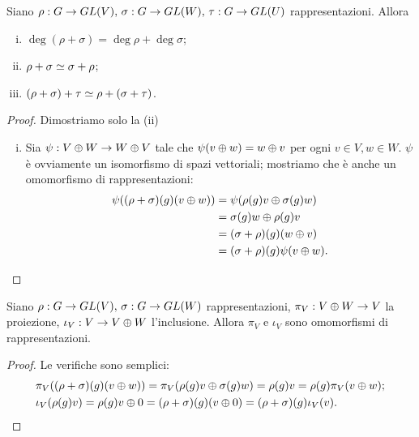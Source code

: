 \begin{proposition}
Siano $\rho:G\to GL(V),\,\allowbreak\sigma:G\to GL(W),\,\allowbreak\tau:G\to GL(U)$ rappresentazioni. Allora
\begin{enumerate}[(i)]
\item $\deg(\rho+\sigma)=\deg\rho+\deg\sigma$;
\item $\rho+\sigma\simeq\sigma+\rho$;
\item $(\rho+\sigma)+\tau\simeq\rho+(\sigma+\tau)$.
\end{enumerate}
\end{proposition}
\begin{proof}
Dimostriamo solo la (ii)
\begin{enumerate}[(i)]
\addtocounter{enumi}{1}
\item Sia $\psi:V\oplus W\to W\oplus V$ tale che $\psi(v\oplus w)=w\oplus v$ per ogni $v\in V\comma w\in W$. $\psi$ è ovviamente un isomorfismo di spazi vettoriali; mostriamo che è anche un omomorfismo di rappresentazioni:
\begin{align*}
\psi((\rho+\sigma)(g)(v\oplus w))&=\psi(\rho(g)v\oplus\sigma(g)w)\\
&=\sigma(g)w\oplus\rho(g)v\\
&=(\sigma+\rho)(g)(w\oplus v)\\
&=(\sigma+\rho)(g)\psi(v\oplus w).
\end{align*}
\end{enumerate}
\end{proof}

\begin{proposition}
Siano $\rho:G\to GL(V),\,\allowbreak\sigma:G\to GL(W)$ rappresentazioni, $\pi_V:V\oplus W\to V$ la proiezione, $\iota_V:V\to V\oplus W$ l'inclusione. Allora $\pi_V$ e $\iota_V$ sono omomorfismi di rappresentazioni.
\end{proposition}
\begin{proof}
Le verifiche sono semplici:
\begin{align*}
&\pi_V((\rho+\sigma)(g)(v\oplus w))=\pi_V(\rho(g)v\oplus\sigma(g)w)=\rho(g)v=\rho(g)\pi_V(v\oplus w);\\
&\iota_V(\rho(g)v)=\rho(g)v\oplus 0=(\rho+\sigma)(g)(v\oplus 0)=(\rho+\sigma)(g)\iota_V(v).\\
\end{align*}
\end{proof}

